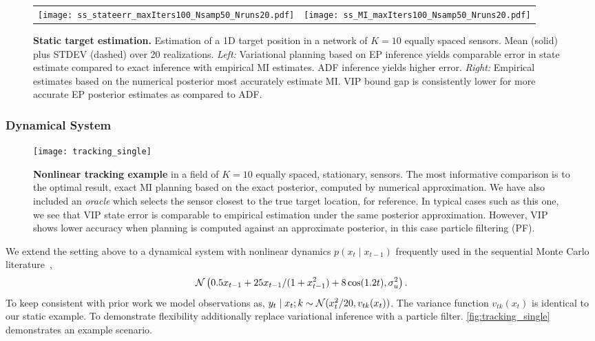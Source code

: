 \begin{figure}
  \begin{tabular}{cc}
    \hspace{-3mm}\texttt{[image: ss\_stateerr\_maxIters100\_Nsamp50\_Nruns20.pdf]} &
    \hspace{-5mm}\texttt{[image: ss\_MI\_maxIters100\_Nsamp50\_Nruns20.pdf]}
  \end{tabular}
  
  \caption{\small\textbf{Static target estimation.} Estimation of a 1D
    target position in a network of $K=10$ equally spaced sensors.
    Mean (solid) plus STDEV (dashed) over 20 realizations.  \emph{Left:}
    Variational planning based on EP inference yields comparable error
    in state estimate compared to exact inference with empirical MI
    estimates. ADF inference yields higher error.  \emph{Right:}
    Empirical estimates based on the numerical posterior most
    accurately estimate MI.  VIP bound gap is consistently lower for
    more accurate EP posterior estimates as compared to
    ADF.}  \label{fig:static}
\end{figure}

\subsubsection{Dynamical System}

\begin{figure*}[!t]
  \centering
  \hspace{-3mm}
  \texttt{[image: tracking\_single]}
  \vspace{-3mm}
  \caption{\small\textbf{Nonlinear tracking example} in a field of
    $K=10$ equally spaced, stationary, sensors.  The most informative
    comparison is to the optimal result, exact MI planning based on
    the exact posterior, computed by numerical approximation.  We have
    also included an \emph{oracle} which selects the sensor closest to
    the true target location, for reference.  In typical cases such as
    this one, we see that VIP state error is comparable to empirical
    estimation under the same posterior approximation.  However, VIP
    shows lower accuracy when planning is computed against an
    approximate posterior, in this case particle filtering (PF).}
  \label{fig:ep}
\end{figure*}

We extend the setting above to a dynamical system with nonlinear
dynamics $p(x_t\mid x_{t-1})$ frequently used in the sequential Monte
Carlo literature~\citep{kitagawa1996monte, gordon1993novel,
cappe2007overview},
\[
  \mathcal{N}\left(0.5 x_{t-1} + 25 x_{t-1} / (1+x_{t-1}^2)
  + 8 \cos(1.2t), \sigma_u^2\right).
\]
To keep consistent with prior work we model observations
as, \mbox{$y_t \mid x_t; k \sim \mathcal{N}(x_t^2/20, v_{tk}(x_t))$}.  The
variance function $v_{tk}(x_t)$ is identical to our static example.
To demonstrate flexibility additionally replace variational inference
with a particle filter.  \FIG\ref{fig:tracking_single} demonstrates an
example scenario.

